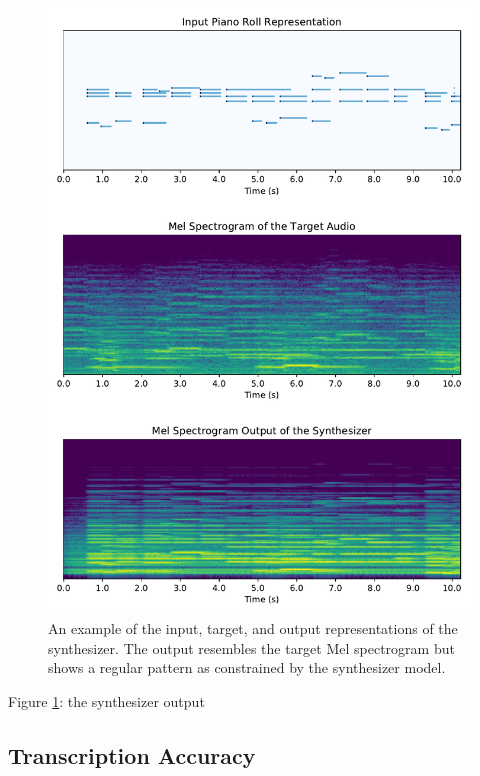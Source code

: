 \begin{figure}
\centering
\includegraphics[width=\textwidth]{synthesizer-output.pdf}
\caption{An example of the input, target, and output representations of the synthesizer. The output resembles the target Mel spectrogram but shows a regular pattern as constrained by the synthesizer model.}\label{fig:synthesizer-output}
\end{figure}

Figure \ref{fig:synthesizer-output}: the synthesizer output

\subsection{Transcription Accuracy}

